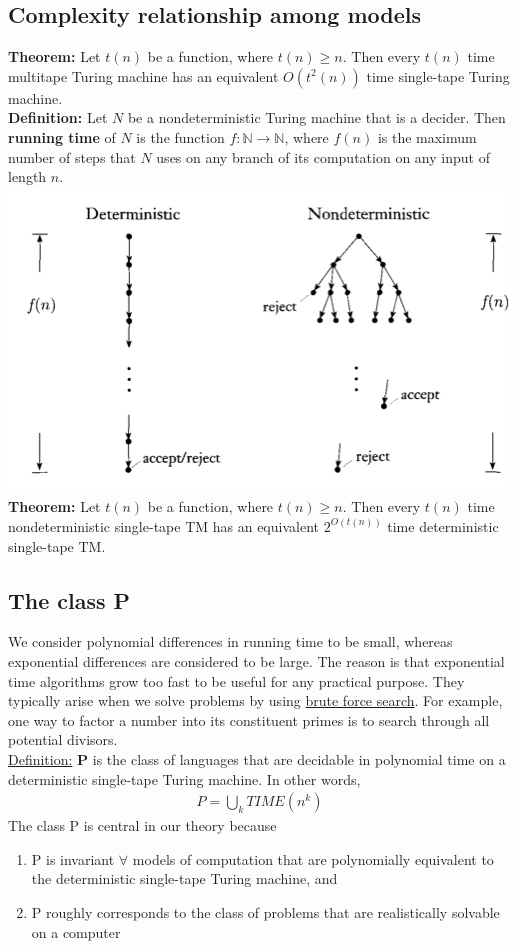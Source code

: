 \documentclass[a4paper]{article}
\begin{document}
\subsection{Complexity relationship among models} %
\label{sub:Complexity relationship among models}
{\bf Theorem:} Let $t(n)$ be a function, where $t(n)\geq n$. Then every $t(n)$ time multitape Turing machine has an equivalent $O(t^2(n))$ time single-tape Turing machine.\\
{\bf Definition:} Let $N$ be a nondeterministic Turing machine that is a decider. Then {\bf running time} of $N$ is the function $f:\mathbb{N}\rightarrow\mathbb{N}$, where $f(n)$ is the maximum number  of steps that $N$ uses on any branch of its computation on any input of length $n$. \\
\includegraphics[scale=.5]{runtime.png}\\
{\bf Theorem:} Let $t(n)$ be a function, where $t(n)\geq n$. Then every $t(n)$ time nondeterministic single-tape TM has an equivalent $2^{O(t(n))}$ time deterministic single-tape TM.\\
\subsection{The class P} %
\label{sub:The class P}
We consider polynomial differences in running time to be small, whereas exponential differences are considered to be large. The reason is that exponential time algorithms grow too fast to be useful for any practical purpose. They typically arise when we solve problems by using \underline{brute force search}. For example, one way to factor a number into its constituent primes is to search through all potential divisors.\\
\underline{Definition:} {\bf P} is the class of languages that are decidable in polynomial time on a deterministic single-tape Turing machine. In other words,
\begin{align}
  P=\bigcup_k TIME(n^k)
\end{align}
The class P is central in our theory because
\begin{enumerate}
  \item P is invariant $\forall$ models of computation that are polynomially equivalent to the deterministic single-tape Turing machine, and
  \item P roughly corresponds to the class of problems that are realistically solvable on a computer 
\end{enumerate}
\end{document}
